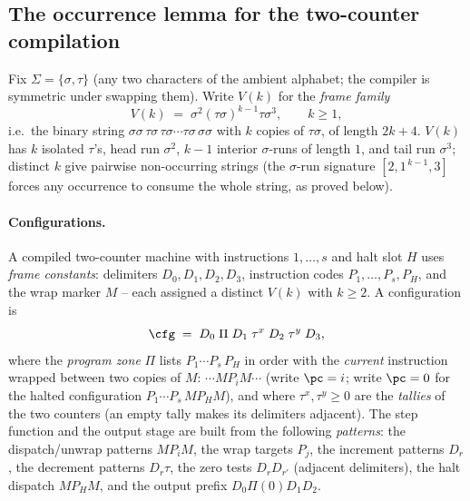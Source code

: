 
\subsection{The occurrence lemma for the two-counter compilation}

Fix $\Sigma=\{\sigma,\tau\}$ (any two characters of the ambient
alphabet; the compiler is symmetric under swapping them).  Write
$V(k)$ for the \emph{frame family}
\[
V(k) \;=\; \sigma^2(\tau\sigma)^{k-1}\tau\sigma^3 ,
\qquad k \ge 1 ,
\]
i.e.\ the binary string $\sigma\sigma\,\tau\sigma\,\tau\sigma\cdots
\tau\sigma\,\sigma\sigma$ with $k$ copies of $\tau\sigma$, of length
$2k+4$.  $V(k)$ has $k$ isolated $\tau$'s, head run $\sigma^2$, $k-1$
interior $\sigma$-runs of length $1$, and tail run $\sigma^3$;
distinct $k$ give pairwise non-occurring strings (the $\sigma$-run
signature $[2,1^{\,k-1},3]$ forces any occurrence to consume the
whole string, as proved below).

\paragraph{Configurations.}
A compiled two-counter machine with instructions $1,\dots,s$ and halt
slot $H$ uses \emph{frame constants}: delimiters $D_0,D_1,D_2,D_3$,
instruction codes $P_1,\dots,P_s,P_H$, and the wrap marker $M$ -- each
assigned a distinct $V(k)$ with $k\ge 2$.  A configuration is
\[
\cfg \;=\; D_0\;\Pi\;D_1\;\tau^{x}\;D_2\;\tau^{y}\;D_3 ,
\]
where the \emph{program zone} $\Pi$ lists $P_1\cdots P_s\,P_H$ in
order with the \emph{current} instruction wrapped between two copies
of $M$: $\cdots M P_i M\cdots$ (write $\pc=i$; write $\pc=0$ for the
halted configuration $P_1\cdots P_s\,M P_H M$), and where
$\tau^{x},\tau^{y}\ge 0$ are the \emph{tallies} of the two counters
(an empty tally makes its delimiters adjacent).  The step function
and the output stage are built from the following \emph{patterns}:
the dispatch/unwrap patterns $M P_i M$, the wrap targets $P_j$, the
increment patterns $D_r$, the decrement patterns $D_r\tau$, the zero
tests $D_rD_{r'}$ (adjacent delimiters), the halt dispatch $M P_H M$,
and the output prefix $D_0\Pi(0)D_1D_2$.

